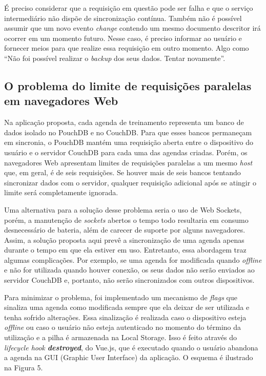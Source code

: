 \documentclass[
	article,			%
	12pt,				%
	oneside,			%
	a4paper,			%
	english,			%
	brazil,				%
	sumario=tradicional
	]{abntex2}
\begin{document}
É preciso considerar que a requisição em questão pode ser falha e que o serviço intermediário não dispõe de sincronização contínua. Também não é possível assumir que um novo evento \textit{change} contendo um mesmo documento descritor irá ocorrer em um momento futuro. Nesse caso, é preciso informar ao usuário e fornecer meios para que realize essa requisição em outro momento. Algo como “Não foi possível realizar o \textit{backup} dos seus dados. Tentar novamente”.

\subsection{O problema do limite de requisições paralelas em navegadores Web}

Na aplicação proposta, cada agenda de treinamento representa um banco de dados isolado no PouchDB e no CouchDB. Para que esses bancos permaneçam em sincronia, o PouchDB mantém uma requisição aberta entre o dispositivo do usuário e o servidor CouchDB para cada uma das agendas criadas. Porém, os navegadores Web apresentam limites de requisições paralelas a um mesmo \textit{host} que, em geral, é de seis requisições. Se houver mais de seis bancos tentando sincronizar dados com o servidor, qualquer requisição adicional após se atingir o limite será completamente ignorada.

Uma alternativa para a solução desse problema seria o uso de Web Sockets, porém, a manutenção de \textit{sockets} abertos o tempo todo resultaria em consumo desnecessário de bateria, além de carecer de suporte por alguns navegadores. Assim, a solução proposta aqui prevê a sincronização de uma agenda apenas durante o tempo em que ela estiver em uso. Entretanto, essa abordagem traz algumas complicações. Por exemplo, se uma agenda for modificada quando \textit{offline} e não for utilizada quando houver conexão, os seus dados não serão enviados ao servidor CouchDB e, portanto, não serão sincronizados com outros dispositivos.

Para minimizar o problema, foi implementado um mecanismo de \textit{flags} que sinaliza uma agenda como modificada sempre que ela deixar de ser utilizada e tenha sofrido alterações. Essa sinalização é realizada caso o dispositivo esteja \textit{offline} ou caso o usuário não esteja autenticado no momento do término da utilização e a pilha é armazenada na Local Storage. Isso é feito através do \textit{lifecycle hook \textbf{destroyed}}, do Vue.js, que é executado quando o usuário abandona a agenda na GUI (Graphic User Interface) da aplicação. O esquema é ilustrado na Figura 5.
\end{document}
